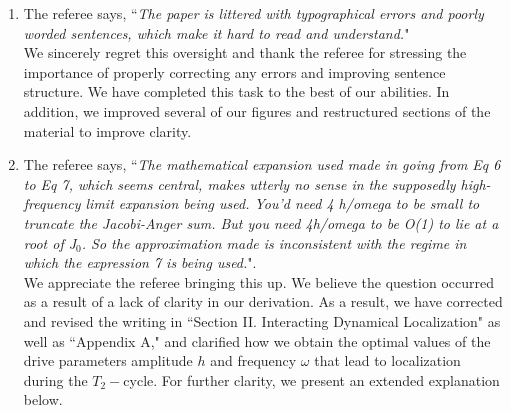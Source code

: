 \documentclass[aps,prb,reprint,showpacs,floatfix,superscriptaddress, onecolumn, nofootinbib, 9pt]{revtex4-2}
\newcommand{\ar}[1]{{\color{blue}#1}} %
\begin{document}
\begin{enumerate}
    \item The referee says, ``\textit{The paper is littered with typographical errors and poorly worded sentences, which make it hard to read and understand.}"\\

    \ar{
We sincerely regret this oversight and thank the referee for stressing the importance of properly correcting any errors and improving sentence structure. We have completed this task to the best of our abilities. In addition, we improved several of our figures and restructured sections of the material to improve clarity.
    }
    \item The referee says, ``\textit{The mathematical
    expansion used made in going from Eq 6 to Eq 7, which seems central, makes utterly no sense in the supposedly high-frequency limit expansion being used. You'd need 4 h/omega to be small to truncate the Jacobi-Anger sum. But you need 4h/omega to be O(1) to lie at a root of J$_0$. So the approximation made is inconsistent with the regime in which the expression 7 is being used.}".\\

    \ar{
We appreciate the referee bringing this up. We believe the question occurred as a result of a lack of clarity in our derivation. As a result, we have corrected and revised the writing in ``Section II. Interacting Dynamical Localization" as well as ``Appendix A," and clarified how we obtain the optimal values of the drive parameters amplitude $h$ and frequency $\omega$ that lead to localization during the $T_2-$cycle. For further clarity, we present an extended explanation below.\\

}
\end{enumerate}
\end{document}

